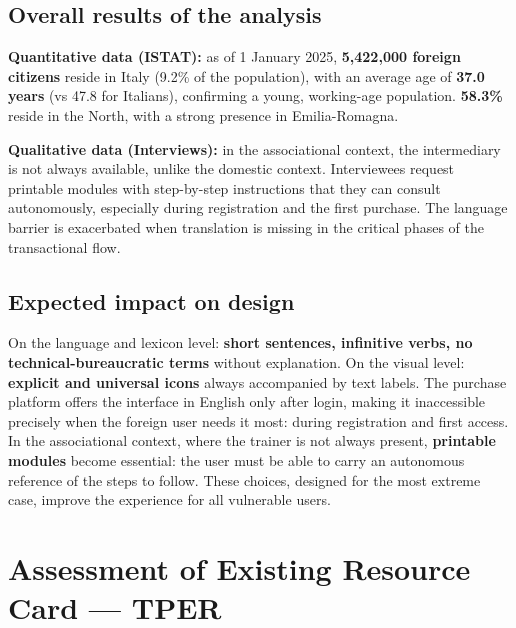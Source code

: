 ﻿\documentclass[11pt,a4paper]{article}
\begin{document}
\subsection*{Overall results of the analysis}
\begin{tcolorbox}[base]
\textbf{Quantitative data (ISTAT):} as of 1 January 2025,
\textbf{5,422,000 foreign citizens} reside in
Italy (9.2\% of the population),
with an average age of \textbf{37.0 years} (vs 47.8 for Italians), confirming
a young, working-age population. \textbf{58.3\%} reside
in the North, with a strong presence in Emilia-Romagna.

\vspace{0.2cm}
\textbf{Qualitative data (Interviews):} in the associational context,
the intermediary is not always available, unlike the domestic
context. Interviewees request printable modules with
step-by-step instructions that they can consult autonomously,
especially during registration and the first purchase. The
language barrier is exacerbated when translation is missing in the
critical phases of the transactional flow.
\end{tcolorbox}
\subsection*{Expected impact on design}
\begin{tcolorbox}[base]
On the language and lexicon level: \textbf{short sentences, infinitive
verbs, no technical-bureaucratic terms} without explanation.
On the visual level: \textbf{explicit and universal icons} always
accompanied by text labels. The purchase platform offers the
interface in English only after login, making it inaccessible
precisely when the foreign user needs it most: during
registration and first access. In the associational context, where the
trainer is not always present, \textbf{printable modules} become
essential: the user must be able to carry an autonomous
reference of the steps to follow. These choices, designed for the most
extreme case, improve the experience for all vulnerable users.
\end{tcolorbox}

\newpage
{\raggedright\section{Assessment of Existing Resource Card --- TPER}\par}
\end{document}
